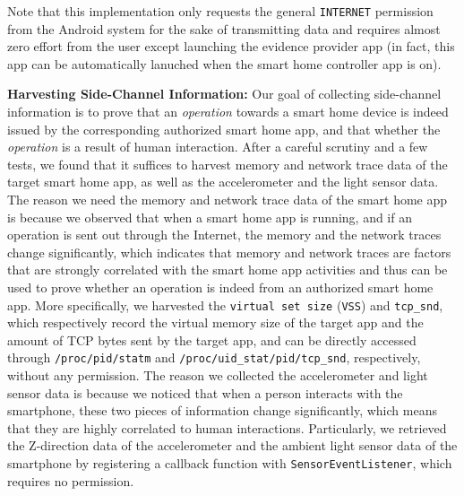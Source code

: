 \documentclass[letterpaper,12pt]{article}
\begin{document}
Note that this implementation only requests the general \texttt{INTERNET} permission from the Android system for the sake of transmitting data and requires almost zero effort from the user except launching the evidence provider app (in fact, this app can be automatically lanuched when the smart home controller app is on). %

\textbf{Harvesting Side-Channel Information:} 
Our goal of collecting side-channel information is to prove that an \textit{operation} towards a smart home device is indeed issued by the corresponding authorized smart home app, and that whether the \textit{operation}  is a result of human interaction. After a careful scrutiny and a few tests, we found that it suffices to harvest memory and network trace data of the target smart home app, as well as the accelerometer and the light sensor data. The reason we need the memory and network trace data of the smart home app is because we observed that when a smart home app is running, and if an operation is sent out through the Internet, the memory and the network traces change significantly, which indicates that memory and network traces are factors that are strongly correlated with the smart home app activities and thus can be used to prove whether an operation is indeed from an authorized smart home app. More specifically, we harvested the \texttt{virtual set size} (\texttt{VSS}) and \texttt{tcp\_snd}, which respectively record the virtual memory size of the target app and the amount of TCP bytes sent by the target app, and can be directly accessed through \texttt{/proc/pid/statm} and \texttt{/proc/uid\_stat/pid/tcp\_snd}, respectively, without any permission. The reason we collected the accelerometer and light sensor data is because we noticed that when a person interacts with the smartphone, these two pieces of information change significantly, which means that they are highly correlated to human interactions. Particularly, we retrieved the Z-direction data of the accelerometer and the ambient light sensor data of the smartphone by registering a callback function with \texttt{SensorEventListener}, which requires no permission.
\end{document}
